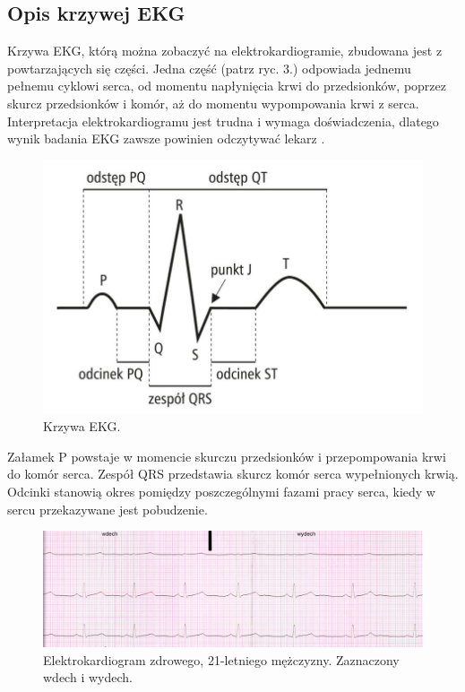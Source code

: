 \documentclass[12pt,a4paper]{article}
\begin{document}
\subsection{Opis krzywej EKG}
Krzywa EKG, którą można zobaczyć na elektrokardiogramie, zbudowana jest z powtarzających się części. Jedna część (patrz ryc. 3.) odpowiada jednemu pełnemu cyklowi serca, od momentu napłynięcia krwi do przedsionków, poprzez skurcz przedsionków i komór, aż do momentu wypompowania krwi z serca. Interpretacja elektrokardiogramu jest trudna i wymaga doświadczenia, dlatego wynik badania EKG zawsze powinien odczytywać lekarz \cite{czym-jest-ekg-mp-pl}.

\begin{figure}[h]
    \centering
    \includegraphics[width=0.75\linewidth]{images/krzywa-ekg.jpg}
    \caption{Krzywa EKG. \cite{ekg-analiza}}
\end{figure}

Załamek P powstaje w momencie skurczu przedsionków i przepompowania krwi do komór serca.
Zespół QRS przedstawia skurcz komór serca wypełnionych krwią.
Odcinki stanowią okres pomiędzy poszczególnymi fazami pracy serca, kiedy w sercu przekazywane jest pobudzenie.

\begin{figure}[H]
    \centering
    \includegraphics[width=1\linewidth]{EKG_wykres.jpg}
    \caption{Elektrokardiogram zdrowego, 21-letniego mężczyzny. Zaznaczony wdech i wydech. \cite{elektrokardiogram-wykres}}
\end{figure}
\end{document}
